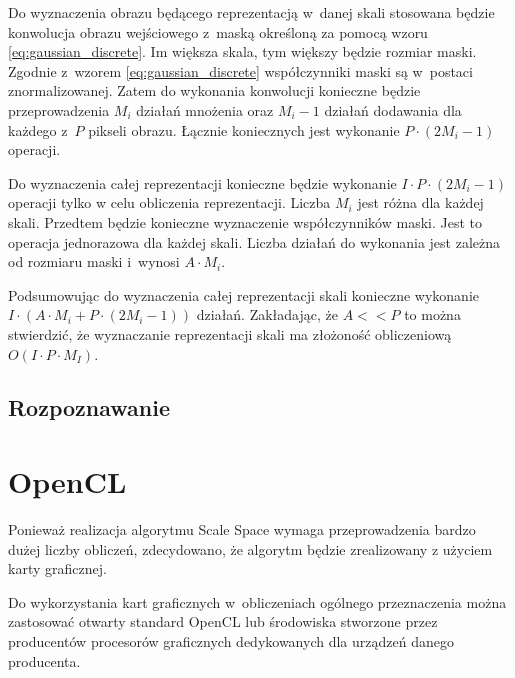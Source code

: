 Do wyznaczenia obrazu będącego reprezentacją w~danej skali stosowana będzie konwolucja obrazu wejściowego z~maską określoną za pomocą wzoru \ref{eq:gaussian_discrete}. Im większa skala, tym większy będzie rozmiar maski. Zgodnie z~wzorem \ref{eq:gaussian_discrete} współczynniki maski są w~postaci znormalizowanej. Zatem do wykonania konwolucji konieczne będzie przeprowadzenia $ M_i $ działań mnożenia oraz $ M_i - 1 $ działań dodawania dla każdego z~$P$ pikseli obrazu. Łącznie koniecznych jest wykonanie $ P \cdot (2M_i - 1) $ operacji.

Do wyznaczenia całej reprezentacji konieczne będzie wykonanie 
$ I \cdot P \cdot (2M_i - 1) $ operacji tylko w celu obliczenia reprezentacji. Liczba $ M_i $ jest różna dla każdej skali. Przedtem będzie konieczne wyznaczenie współczynników maski. Jest to operacja jednorazowa dla każdej skali. Liczba działań do wykonania jest zależna od rozmiaru maski i~wynosi $ A \cdot M_i $.

Podsumowując do wyznaczenia całej reprezentacji skali konieczne wykonanie $ I \cdot (A \cdot M_i + P \cdot (2M_i - 1)) $ działań. Zakładając, że $ A << P $ to można stwierdzić, że wyznaczanie reprezentacji skali ma złożoność obliczeniową $ O(I \cdot P \cdot M_I) $.

\subsection{Rozpoznawanie}
\label{subsec:rozpoznawanie}


\section{OpenCL}
\label{sec:OpenCL}

Ponieważ realizacja algorytmu Scale Space wymaga przeprowadzenia bardzo dużej liczby obliczeń, zdecydowano, że algorytm będzie zrealizowany z użyciem karty graficznej.

Do wykorzystania kart graficznych w~obliczeniach ogólnego przeznaczenia można zastosować otwarty standard OpenCL lub środowiska stworzone przez producentów procesorów graficznych dedykowanych dla urządzeń danego producenta.

